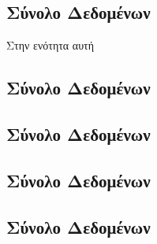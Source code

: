 \subsection{Σύνολο Δεδομένων }
Στην ενότητα αυτή
\subsection{Σύνολο Δεδομένων }
\subsection{Σύνολο Δεδομένων }
\subsection{Σύνολο Δεδομένων }
\subsection{Σύνολο Δεδομένων }




